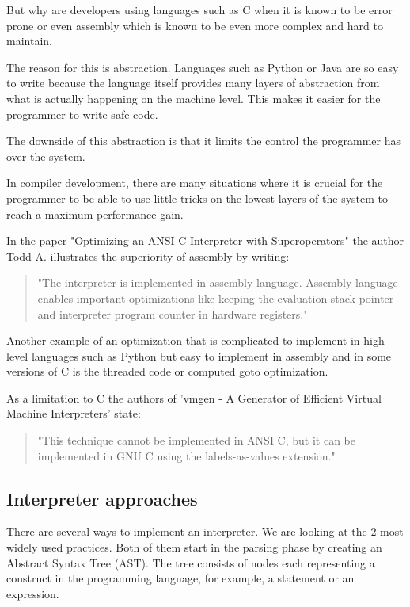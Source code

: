 \documentclass{article}
\begin{document}
But why are developers using languages such as C when it is known to be error
prone or even assembly which is known to be even more complex and hard to
maintain.

The reason for this is abstraction. Languages such as Python or Java are so
easy to write because the language itself provides many layers of abstraction
from what is actually happening on the machine level. This makes it easier for
the programmer to write safe code. 

The downside of this abstraction is that it limits the control the programmer
has over the system.

In compiler development, there are many situations where it is crucial for the
programmer to be able to use little tricks on the lowest layers of the system
to reach a maximum performance gain.

In the paper "Optimizing an ANSI C Interpreter with Superoperators" the author
Todd A. illustrates the superiority of assembly by writing:

\begin{quotation}
"The interpreter is implemented in assembly language.
Assembly language enables important optimizations like keeping the evaluation
stack pointer and interpreter program counter in hardware registers." ~\cite{superoperators}
\end{quotation}

Another example of an optimization that is complicated to implement in high
level languages such as Python but easy to implement in assembly and in some
versions of C is the threaded code or computed goto optimization.

As a limitation to C the authors of 'vmgen - A Generator of Efficient Virtual
Machine Interpreters' state:
\begin{quotation} 
"This technique cannot be implemented in ANSI C, but it can be implemented in
GNU C using the labels-as-values extension." ~\cite{vmgen} 
\end{quotation}

\subsection{Interpreter approaches}
There are several ways to implement an interpreter. We are looking
at the 2 most widely used practices. 
Both of them start in the parsing phase by creating an Abstract Syntax
Tree (AST). The tree consists of nodes each representing a construct in
the programming language, for example, a statement or an expression.
\end{document}
